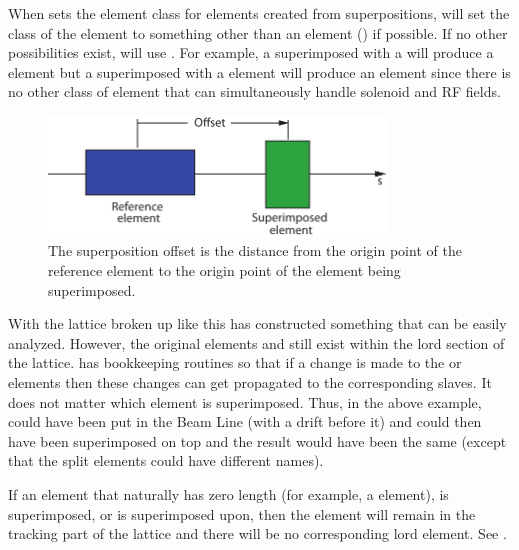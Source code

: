 When \bmad sets the element class for elements created from
superpositions, \bmad will set the class of the element to something
other than an  element () if
possible. If no other possibilities exist, \bmad will use
. For example, a  superimposed with a
 will produce a  element but a 
superimposed with a  element will produce an
 element since there is no other class of element that
can simultaneously handle solenoid and RF fields.

  \begin{figure}[tb]
  \centering 
  \includegraphics[width=0.8\textwidth]{superimpose.pdf} 
  \caption[Superposition Offset.]{
The superposition offset is the distance from the origin point of the
reference element to the origin point of the element being
superimposed.
  }
  \label{f:superimpose}
  \end{figure}

With the lattice broken up like this \bmad has constructed something
that can be easily analyzed. However, the original elements  and
 still exist within the lord section of the lattice. \bmad has
bookkeeping routines so that if a change is made to the  or
 elements then these changes can get propagated to the
corresponding slaves. It does not matter which element is
superimposed. Thus, in the above example,  could have been put
in the Beam Line (with a drift before it) and  could then have
been superimposed on top and the result would have been the same
(except that the split elements could have different names).

If an element that naturally has zero length (for example, a
 element), is superimposed, or is superimposed upon, then the
element will remain in the tracking part of the lattice and there will be
no corresponding lord element. See .
 
